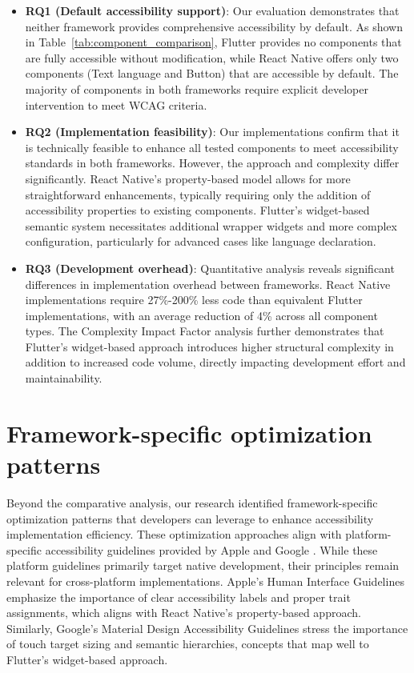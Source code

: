\begin{itemize}
    \item \textbf{RQ1 (Default accessibility support)}: Our evaluation demonstrates that neither framework provides comprehensive accessibility by default. As shown in Table~\ref{tab:component_comparison}, Flutter provides no components that are fully accessible without modification, while React Native offers only two components (Text language and Button) that are accessible by default. The majority of components in both frameworks require explicit developer intervention to meet WCAG criteria.

    \item \textbf{RQ2 (Implementation feasibility)}: Our implementations confirm that it is technically feasible to enhance all tested components to meet accessibility standards in both frameworks. However, the approach and complexity differ significantly. React Native's property-based model allows for more straightforward enhancements, typically requiring only the addition of accessibility properties to existing components. Flutter's widget-based semantic system necessitates additional wrapper widgets and more complex configuration, particularly for advanced cases like language declaration.

    \item \textbf{RQ3 (Development overhead)}: Quantitative analysis reveals significant differences in implementation overhead between frameworks. React Native implementations require 27\%-200\% less code than equivalent Flutter implementations, with an average reduction of 4\% across all component types. The Complexity Impact Factor analysis further demonstrates that Flutter's widget-based approach introduces higher structural complexity in addition to increased code volume, directly impacting development effort and maintainability.
\end{itemize}

\section{Framework-specific optimization patterns}
\label{sec:optimization-patterns}

Beyond the comparative analysis, our research identified framework-specific optimization patterns that developers can leverage to enhance accessibility implementation efficiency. 
These optimization approaches align with platform-specific accessibility guidelines provided by Apple \cite{apple-accessibility} and Google \cite{google-accessibility}. While these platform guidelines primarily target native development, their principles remain relevant for cross-platform implementations. Apple's Human Interface Guidelines emphasize the importance of clear accessibility labels and proper trait assignments, which aligns with React Native's property-based approach. Similarly, Google's Material Design Accessibility Guidelines stress the importance of touch target sizing and semantic hierarchies, concepts that map well to Flutter's widget-based approach.

